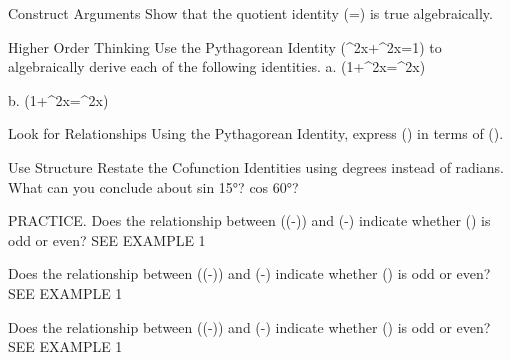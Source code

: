 \documentclass{article}
\newenvironment{practice}[2]{}{}        %
\newcommand{\answer}[1]{}               %
\newcommand{\te}[1]{}                   %
\begin{document}
\begin{practice}{16}{2}
Construct Arguments Show that the quotient identity (\cot\theta=\frac{\cos\theta}{\sin\theta}) is true algebraically.
\answer{(\cot\theta=\frac{\cos\theta}{\sin\theta}=\frac{\frac xr}{\frac yr}=\frac xr\cdot\frac ry=\frac xy).}
\end{practice}
\begin{practice}{17}{2}
Higher Order Thinking Use the Pythagorean Identity (\sin^2x+\cos^2x=1) to algebraically derive each of the following identities.
a. (1+\tan^2x=\sec^2x)
\answer{a. (\sin^2\theta+\cos^2\theta=1); (\frac{\sin^2\theta}{\cos^2\theta}+\frac{\cos^2\theta}{\cos^2\theta}=\frac1{\cos^2\theta}); (\tan^2\theta+1=\sec^2\theta).}
b. (1+\cot^2x=\csc^2x)
\answer{b. (\sin^2\theta+\cos^2\theta=1); (\frac{\sin^2\theta}{\sin^2\theta}+\frac{\cos^2\theta}{\sin^2\theta}=\frac1{\sin^2\theta}); (1+\cot^2\theta=\csc^2\theta).}
\end{practice}
\begin{practice}{18}{2}
Look for Relationships Using the Pythagorean Identity, express (\sin\theta) in terms of (\cos\theta).
\answer{(\sin\theta=\pm\sqrt{1-\cos^2\theta})}
\end{practice}
\begin{practice}{19}{2}
Use Structure Restate the Cofunction Identities using degrees instead of radians. What can you conclude about sin 15°? cos 60°?
\answer{(\sin(90°-x)=\cos x); (\cos(90°-x)=\sin x); (\sin15°=\cos75°); (\cos60°=\sin30°).}
\te{Printed key omits the tangent cofunction identity requested by the plural heading; retained as printed.}
\end{practice}
\begin{practice}{20}{1}
PRACTICE. Does the relationship between (\csc(-\theta)) and (-\csc\theta) indicate whether (\csc\theta) is odd or even? SEE EXAMPLE 1
\answer{(\csc(-\theta)=\frac1{\sin(-\theta)}=\frac1{-\sin\theta}=-\csc\theta); therefore cosecant is an odd function.}
\end{practice}
\begin{practice}{21}{1}
Does the relationship between (\sec(-\theta)) and (-\sec\theta) indicate whether (\sec\theta) is odd or even? SEE EXAMPLE 1
\answer{(\sec(-\theta)=\frac1{\cos(-\theta)}=\frac1{\cos\theta}=\sec\theta); therefore secant is an even function.}
\te{Printed prompt compares to negative secant; likely the intended comparison is sec(theta), as shown by the even-function key.}
\end{practice}
\begin{practice}{22}{1}
Does the relationship between (\cot(-\theta)) and (-\cot\theta) indicate whether (\cot\theta) is odd or even? SEE EXAMPLE 1
\answer{(\cot(-\theta)=\frac1{\tan(-\theta)}=\frac1{-\tan\theta}=-\cot\theta); therefore cotangent is an odd function.}
\end{practice}
\end{document}
